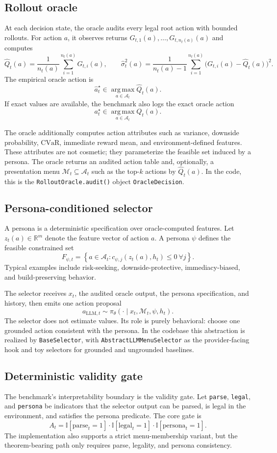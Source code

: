 \documentclass[10pt]{article}
\newcommand{\I}{\mathbb{I}}
\newcommand{\Aset}{\mathcal{A}}
\newcommand{\Menu}{\mathcal{M}}
\newcommand{\CVaR}{\mathrm{CVaR}}
\newcommand{\argmax}{\operatorname*{arg\,max}}
\begin{document}
\subsection{Rollout oracle}
At each decision state, the oracle audits every legal root action with bounded rollouts. For action $a$, it observes returns $G_{t,1}(a),\ldots,G_{t,n_t(a)}(a)$ and computes
$$
\hat Q_t(a) = \frac{1}{n_t(a)}\sum_{i=1}^{n_t(a)} G_{t,i}(a),
\qquad
\hat \sigma_t^2(a) = \frac{1}{n_t(a)-1}\sum_{i=1}^{n_t(a)}\bigl(G_{t,i}(a)-\hat Q_t(a)\bigr)^2.
$$
The empirical oracle action is
$$
\hat a_t^\star \in \argmax_{a \in \Aset_t} \hat Q_t(a).
$$
If exact values are available, the benchmark also logs the exact oracle action
$$
a_t^\star \in \argmax_{a \in \Aset_t} Q_t(a).
$$

The oracle additionally computes action attributes such as variance, downside probability, $\CVaR$, immediate reward mean, and environment-defined features. These attributes are not cosmetic; they parameterize the feasible set induced by a persona. The oracle returns an audited action table and, optionally, a presentation menu $\Menu_t \subseteq \Aset_t$ such as the top-$k$ actions by $\hat Q_t(a)$. In the code, this is the \texttt{RolloutOracle.audit()} object \texttt{OracleDecision}.

\subsection{Persona-conditioned selector}
A persona is a deterministic specification over oracle-computed features. Let $z_t(a) \in \mathbb{R}^m$ denote the feature vector of action $a$. A persona $\psi$ defines the feasible constrained set
$$
F_{\psi,t} = \left\{ a \in \Aset_t : c_{\psi,j}(z_t(a), h_t) \le 0 \ \forall j \right\}.
$$
Typical examples include risk-seeking, downside-protective, immediacy-biased, and build-preserving behavior.

The selector receives $x_t$, the audited oracle output, the persona specification, and history, then emits one action proposal
$$
a_{\mathrm{LLM},t} \sim \pi_\theta(\cdot \mid x_t, \Menu_t, \psi, h_t).
$$
The selector does not estimate values. Its role is purely behavioral: choose one grounded action consistent with the persona. In the codebase this abstraction is realized by \texttt{BaseSelector}, with \texttt{AbstractLLMMenuSelector} as the provider-facing hook and toy selectors for grounded and ungrounded baselines.

\subsection{Deterministic validity gate}
The benchmark's interpretability boundary is the validity gate. Let \texttt{parse}, \texttt{legal}, and \texttt{persona} be indicators that the selector output can be parsed, is legal in the environment, and satisfies the persona predicate. The core gate is
$$
A_t = \I[\mathrm{parse}_t = 1] \cdot \I[\mathrm{legal}_t = 1] \cdot \I[\mathrm{persona}_t = 1].
$$
The implementation also supports a strict menu-membership variant, but the theorem-bearing path only requires parse, legality, and persona consistency.
\end{document}

